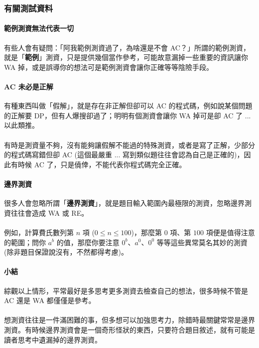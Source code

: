 \documentclass[12pt,a4paper,oneside]{report}
\begin{document}
\begin{CJK}{UTF8}{bkai}
\subsubsection{有關測試資料}

\paragraph{範例測資無法代表一切}有些人會有疑問：「阿我範例測資過了，為啥還是不會 AC？」所謂的範例測資，就是「\textbf{範例}」測資，只是提供幾個當作參考，可能故意漏掉一些重要的資訊讓你 WA 掉，或是誤導你的想法可是範例測資會讓你正確等等陰險手段。

\paragraph{AC 未必是正解}有種東西叫做「假解」，就是存在非正解但卻可以 AC 的程式碼，例如說某個問題的正解要 DP，但有人爆搜卻過了；明明有個測資會讓你 WA 掉可是卻 AC 了 ... 以此類推。
\paragraph{}有時是測資量不夠，沒有能夠讓假解不能過的特殊測資，或者是寫了正解，少部分的程式碼寫錯但卻 AC (這個最嚴重 ... 寫到類似題往往會認為自己是正確的)，因此有時候 AC 了，只是僥倖，不能代表你程式碼完全正確。

\paragraph{邊界測資}很多人會忽略所謂「\textbf{邊界測資}」，就是題目輸入範圍內最極限的測資，忽略邊界測資往往會造成 WA 或 RE。
\paragraph{}例如，計算費氏數列第 $n$ 項 ($0\leq{n}\leq{100}$)，那麼第 $0$ 項、第 $100$ 項便是值得注意的範圍；問你 $a^b$ 的值，那麼你要注意 $0^b$、$a^0$、$0^0$ 等等這些異常莫名其妙的測資 (除非題目保證說沒有，不然都得考慮)。

\paragraph{小結}綜觀以上情形，平常最好是多思考更多測資去檢查自己的想法，很多時候不管是 AC 還是 WA 都僅僅是參考。
\paragraph{}想測資往往是一件滿困難的事，但多想可以加強思考力，除錯時最關鍵常常是邊界測資。有時候邊界測資會是一個奇形怪狀的東西，只要符合題目敘述，就有可能是讀者思考中遺漏掉的邊界測資。


\end{CJK}
\end{document}
